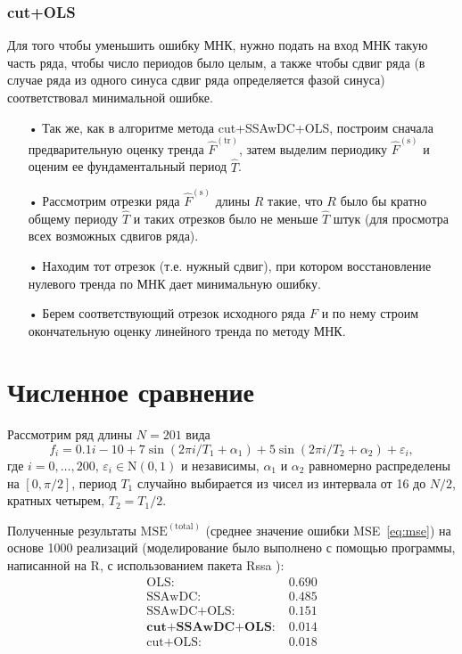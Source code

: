 \documentclass{spisok-article}
\begin{document}
\subsubsection{cut+OLS}
Для того чтобы уменьшить ошибку МНК, нужно подать на вход МНК такую часть ряда, чтобы
число периодов было целым, а также чтобы сдвиг ряда (в случае ряда из одного синуса сдвиг
ряда определяется фазой синуса) соответствовал минимальной ошибке.

\begin{enumerate}
\item[•] Так же, как в алгоритме метода cut+SSAwDC+OLS, построим сначала предварительную оценку тренда $\widehat{F}^\mathrm{(tr)}$, затем выделим периодику $\widehat{F}^\mathrm{(s)}$ и оценим ее фундаментальный период $\widehat{T}$.
\item[•] Рассмотрим отрезки ряда $\widehat{F}^\mathrm{(s)}$ длины $R$ такие, что $R$ было бы кратно общему периоду $\widehat{T}$ и таких отрезков было не меньше $\widehat{T}$ штук (для просмотра всех возможных сдвигов ряда).
\item[•] Находим тот отрезок (т.е. нужный сдвиг), при котором восстановление нулевого тренда по МНК дает минимальную ошибку.
\item[•] Берем соответствующий отрезок исходного ряда $F$ и по нему строим окончательную оценку линейного тренда по методу МНК.
\end{enumerate}

\section{Численное сравнение}
Рассмотрим ряд длины $N=201$ вида
$$f_i=0.1i-10+7\sin(2\pi i/T_1+\alpha_1)+5\sin(2\pi i/T_2+\alpha_2)+\varepsilon_i,$$
 где $i=0,\ldots,200$, $\varepsilon_i \in \mathrm{N}(0,1)$ и независимы, $\alpha_1$ и $\alpha_2$ равномерно распределены на $[0,\pi/2]$,
 период $T_1$ случайно выбирается из чисел из интервала от 16 до $N/2$, кратных четырем, $T_2=T_1/2$.

Полученные результаты $\text{MSE}^\mathrm{(total)}$ (среднее значение ошибки MSE~\eqref{eq:mse}) на основе 1000 реализаций (моделирование было выполнено с помощью
программы, написанной на R, с использованием пакета Rssa \cite{Rssa}):
$$\begin{aligned}
 \text{OLS:}\; &0.690\\
 \text{SSAwDC:}\; &0.485\\
 \text{SSAwDC+OLS:}\; &0.151\\
 \textbf{cut+SSAwDC+OLS:}\; &0.014\\
 \text{cut+OLS:}\; &0.018
\end{aligned}$$
\end{document}
